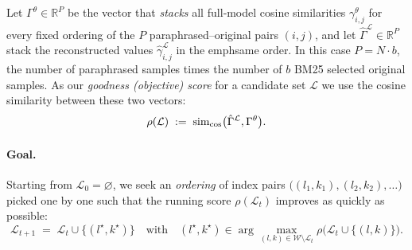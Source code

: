 Let $\Gamma^\theta \in \mathbb{R}^{P}$ be the vector that \emph{stacks} all full‑model cosine similarities $\gamma_{i,j}^{\theta}$ for every fixed ordering of the $P$ paraphrased–original pairs $(i,j)$, and let $\hat{\Gamma}^{\mathcal{L}} \in \mathbb{R}^{P}$ stack the reconstructed values $\hat{\gamma}^{\mathcal{L}}_{i,j}$ in the  emph{same} order. In this case $P = N \cdot b$, the number of paraphrased samples times the number of $b$ BM25 selected original samples. As our \emph{goodness (objective) score} for a candidate set $\mathcal{L}$ we use the cosine similarity between these two vectors:
\begin{equation}
\rho(\mathcal{L}) \;:=\;
\operatorname{sim}_{\cos}\bigl(\hat{\Gamma}^{\mathcal{L}}, \Gamma^\theta\bigr).
\label{eq:rho_objective}
\end{equation}

\paragraph{Goal.}
Starting from $\mathcal{L}_0=\varnothing$, we seek an \emph{ordering} of index pairs
$\bigl((l_1,k_1), (l_2,k_2), \dots\bigr)$ picked one by one such that the running score
$\rho(\mathcal{L}_t)$ improves as quickly as possible:
\[
\mathcal{L}_{t+1} \;=\; \mathcal{L}_t \cup \bigl\{(l^\star,k^\star)\bigr\}
\quad\text{with}\quad
(l^\star,k^\star) \in \arg\max_{(l,k)\in\mathcal{W}\setminus\mathcal{L}_t}
\rho\bigl(\mathcal{L}_t \cup \{(l,k)\}\bigr).
\]

